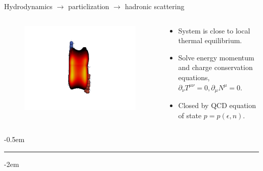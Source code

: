 \documentclass[11pt]{beamer}
\begin{document}
\begin{frame}{Hydrodynamics $\rightarrow$ particlization $\rightarrow$ hadronic scattering}

\begin{columns}[onlytextwidth]
  \begin{column}{0.2\textwidth}
    \begin{figure}
   	\begin{center}
   	\includegraphics[width=\textwidth]{pics/new100.png}
	\end{center} 	
  	\end{figure}
  \end{column}
  \begin{column}{0.8\textwidth}
  \begin{itemize}
  	\item System is close to local thermal equilibrium.
  	\item Solve energy momentum and charge conservation equations,
  	$\partial_\nu T^{\mu\nu} = 0, \partial_\mu N^\mu = 0.$
  	\item Closed by QCD equation of state $p = p(\epsilon, n)$.
  \end{itemize}
  \end{column}
\end{columns}
\begin{center}
\kern-0.5em
\rule{11cm}{0.5pt}
\end{center}
\kern-2em
\begin{columns}[onlytextwidth]
  \begin{column}{0.85\textwidth}
  \begin{itemize}

\end{itemize}
\end{column}
\end{columns}
\end{frame}
\end{document}
